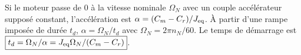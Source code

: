 \begin{corrigebox}
Si le moteur passe de $0$ à la vitesse nominale $\Omega_N$ avec un
                couple accélérateur supposé constant, l'accélération est
                $\alpha=(C_m-C_r)/J_{\rm eq}$. À partir d'une rampe imposée de durée
                $t_d$, $\alpha=\Omega_N/t_d$ avec $\Omega_N=2\pi n_N/60$.
Le temps de démarrage est
                $\boxed{t_d=\Omega_N/\alpha=J_{\rm eq}\Omega_N/(C_m-C_r)}$.
\end{corrigebox}
